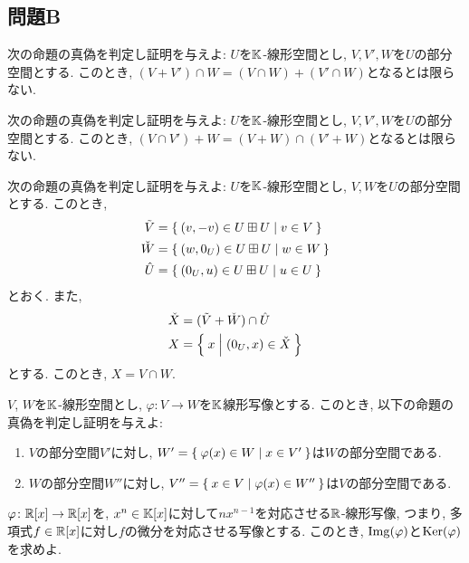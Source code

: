 \subsection{問題B}



\begin{quiz}
  次の命題の真偽を判定し証明を与えよ:
  $U$を$\mathbb{K}$-線形空間とし,
  $V,V', W$を$U$の部分空間とする.
  このとき,
  $(V+V')\cap W=(V\cap W)+(V'\cap W)$となるとは限らない.
\end{quiz}

\begin{quiz}
  次の命題の真偽を判定し証明を与えよ:
  $U$を$\mathbb{K}$-線形空間とし,
  $V,V', W$を$U$の部分空間とする.
  このとき,
  $(V\cap V')+ W=(V+W)\cap (V'+W)$となるとは限らない.
\end{quiz}


\begin{quiz}
  次の命題の真偽を判定し証明を与えよ:
  $U$を$\mathbb{K}$-線形空間とし,
  $V,W$を$U$の部分空間とする.
  このとき,
  \begin{align*}
    \tilde V&=\Set{(v,-v)\in U\boxplus U|v\in V} \\
    \check W&=\Set{(w,0_U)\in U\boxplus U|w\in W} \\
    \hat U&=\Set{(0_U,u)\in U\boxplus U|u\in U}
  \end{align*}
  とおく.
  また,
  \begin{align*}
    \check X &= (\tilde V + \check W) \cap \hat U \\
    X&=\Set{x|(0_U,x) \in\check X}
  \end{align*}
  とする.
  このとき, $X=V\cap W$.
\end{quiz}

\begin{quiz}
  $V$, $W$を$\mathbb{K}$-線形空間とし,
  $\varphi\colon V\to W$を$\mathbb{K}$線形写像とする.
  このとき,
  以下の命題の真偽を判定し証明を与えよ:
  \begin{enumerate}
  \item
    $V$の部分空間$V'$に対し,
    $W'=\Set{\varphi(x)\in W|x\in V'}$は$W$の部分空間である.
  \item
    $W$の部分空間$W''$に対し,
    $V''=\Set{x\in V|\varphi(x)\in W''}$は$V$の部分空間である.
  \end{enumerate}
\end{quiz}

\begin{quiz}
  $\varphi\colon \mathbb{R}[x]\to \mathbb{R}[x]$を,
  $x^n \in \mathbb{K}[x]$に対して$nx^{n-1}$を対応させる$\mathbb{R}$-線形写像,
  つまり, 多項式$f\in\mathbb{R}[x]$に対し$f$の微分を対応させる写像とする.
  このとき, $\operatorname{Img}(\varphi)$と$\operatorname{Ker}(\varphi)$を求めよ.
\end{quiz}

